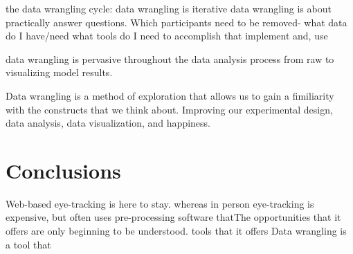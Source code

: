 the data wrangling cycle: 
data wrangling is iterative
data wrangling is about practically answer questions. Which participants need to be removed-
what data do I have/need
what tools do I need to accomplish that
implement
and, use

data wrangling is pervasive throughout the data analysis process from raw to visualizing model results.

Data wrangling is a method of exploration that allows us to gain a fimiliarity with the constructs that we think about. Improving our experimental design, data analysis, data visualization, and happiness.

\section{Conclusions}

Web-based eye-tracking is here to stay. whereas in person eye-tracking is expensive, but often uses pre-processing software thatThe opportunities that it offers are only beginning to be understood. tools that it offers 
Data wrangling is a tool that 
